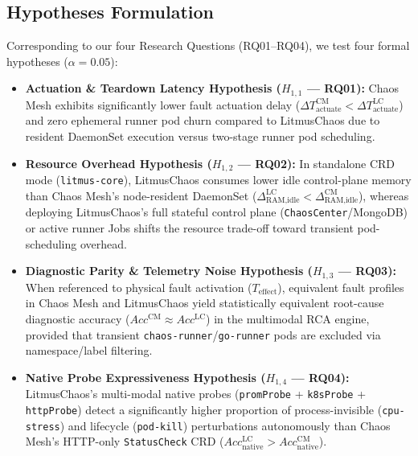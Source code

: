 \subsection{Hypotheses Formulation}
Corresponding to our four Research Questions (RQ01--RQ04), we test four formal hypotheses ($\alpha = 0.05$):
\begin{itemize}[leftmargin=1.2em, itemsep=2pt, topsep=3pt]
    \item \textbf{Actuation \& Teardown Latency Hypothesis ($H_{1,1}$ — RQ01):} Chaos Mesh exhibits significantly lower fault actuation delay ($\Delta T_{\text{actuate}}^{\text{CM}} \allowbreak<\allowbreak \Delta T_{\text{actuate}}^{\text{LC}}$) and zero ephemeral runner pod churn compared to LitmusChaos due to resident DaemonSet execution versus two-stage runner pod scheduling.
    \item \textbf{Resource Overhead Hypothesis ($H_{1,2}$ — RQ02):} In standalone CRD mode (\texttt{litmus-core}), LitmusChaos consumes lower idle control-plane memory than Chaos Mesh's node-resident DaemonSet ($\Delta_{\text{RAM,idle}}^{\text{LC}} \allowbreak<\allowbreak \Delta_{\text{RAM,idle}}^{\text{CM}}$), whereas deploying LitmusChaos's full stateful control plane (\texttt{ChaosCenter}/MongoDB) or active runner Jobs shifts the resource trade-off toward transient pod-scheduling overhead.
    \item \textbf{Diagnostic Parity \& Telemetry Noise Hypothesis ($H_{1,3}$ — RQ03):} When referenced to physical fault activation ($T_{\text{effect}}$), equivalent fault profiles in Chaos Mesh and LitmusChaos yield statistically equivalent root-cause diagnostic accuracy ($Acc^{\text{CM}} \allowbreak\approx\allowbreak Acc^{\text{LC}}$) in the multimodal RCA engine, provided that transient \texttt{chaos-runner}/\texttt{go-runner} pods are excluded via namespace/label filtering.
    \item \textbf{Native Probe Expressiveness Hypothesis ($H_{1,4}$ — RQ04):} LitmusChaos's multi-modal native probes (\texttt{promProbe} + \texttt{k8sProbe} + \texttt{httpProbe}) detect a significantly higher proportion of process-invisible (\texttt{cpu-stress}) and lifecycle (\texttt{pod-kill}) perturbations autonomously than Chaos Mesh's HTTP-only \texttt{StatusCheck} CRD ($Acc_{\text{native}}^{\text{LC}} \allowbreak>\allowbreak Acc_{\text{native}}^{\text{CM}}$).
\end{itemize}



